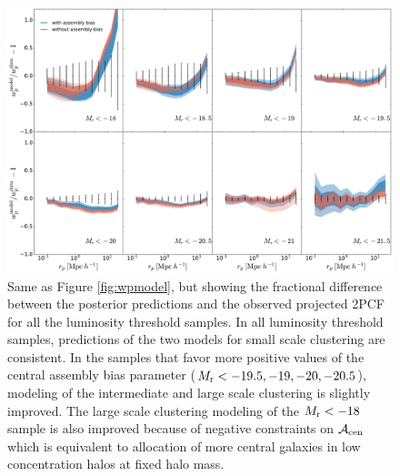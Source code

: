 \documentclass[12pt, preprint]{aastex}
\newcommand{\acen}{\mathcal{A}_{\rm cen}}
\begin{document}
\begin{figure}[p]~\\
\begin{center}
\includegraphics[width=\textwidth]{wpres.pdf}
\caption{Same as Figure \ref{fig:wpmodel}, but showing the fractional difference between the posterior predictions and the observed projected 2PCF for all the luminosity threshold samples. In all luminosity threshold samples, predictions of the two models for small scale clustering are consistent. In the samples that favor more positive values of the central assembly bias parameter ($M_{\rm r}<-19.5,-19,-20,-20.5$), modeling of the intermediate and large scale clustering is slightly improved. The large scale clustering modeling of the $M_{\rm r}<-18$ sample is also improved because of negative constraints on $\acen$ which is equivalent to allocation of more central galaxies in low concentration halos at fixed halo mass.}
\label{fig:wpres}
\end{center}
\end{figure}

\clearpage
\end{document}
